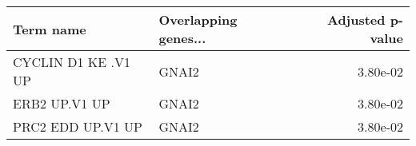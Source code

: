 \begin{tabular}{llr}
\toprule
          Term name & Overlapping genes... &  Adjusted p-value \\
\midrule
CYCLIN D1 KE .V1 UP &                GNAI2 &          3.80e-02 \\
      ERB2 UP.V1 UP &                GNAI2 &          3.80e-02 \\
  PRC2 EDD UP.V1 UP &                GNAI2 &          3.80e-02 \\
\bottomrule
\end{tabular}
